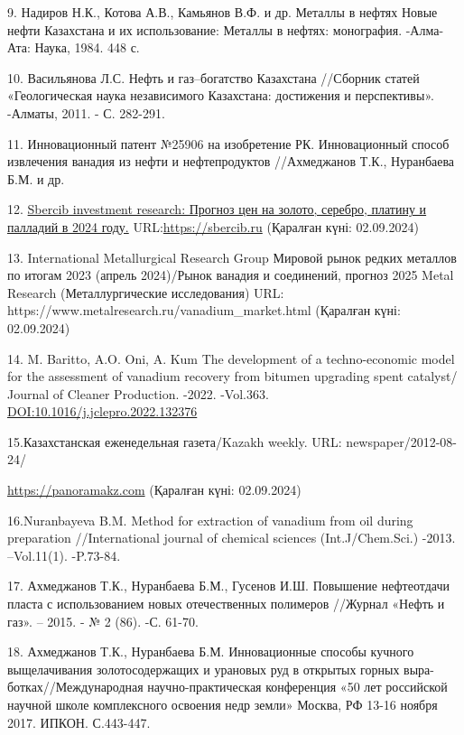 \begin{references}
9. Надиров Н.К., Котова А.В., Камьянов В.Ф. и др. Металлы в нефтях Новые
нефти Казахстана и их использование: Металлы в нефтях: монография.
-Алма-Ата: Наука, 1984. 448 с.

10. Васильянова Л.С. Нефть и газ--богатство Казахстана //Сборник статей
«Геологическая наука независимого Казахстана: достижения и перспективы».
-Алматы, 2011. - С. 282-291.

11. Инновационный патент №25906 на изобретение РК. Инновационный способ
извлечения ванадия из нефти и нефтепродуктов //Ахмеджанов Т.К.,
Нуранбаева Б.М. и др.

12.
\href{https://sbercib.ru/publications/sbercib-investment-research}{Sbercib
investment research: Прогноз цен на золото, серебро, платину и палладий
в 2024 году.} URL:\href{https://sbercib.ru/publication/prognoz-tsen-na-zoloto-serebro-platinu-i-palladii-v-2024-godu}{https://sbercib.ru}
(Қаралған күні: 02.09.2024)

13. International Metallurgical Research Group Мировой рынок редких
металлов по итогам 2023 (апрель 2024)/Рынок ванадия и соединений,
прогноз 2025 Metal Research (Металлургические исследования) URL: https://www.metalresearch.ru/vanadium\_market.html (Қаралған күні:
02.09.2024)

14. M. Baritto, A.O. Oni, A. Kum The development of a techno-economic
model for the assessment of vanadium recovery from bitumen upgrading
spent catalyst/ Journal of Cleaner Production. -2022. -Vol.363.
\href{https://doi.org/10.1016/j.jclepro.2022.132376}{DOI:10.1016/j.jclepro.2022.132376}

15.Казахстанская еженедельная газета/Kazakh weekly. URL:
newspaper/2012-08-24/ 

\href{https://panoramakz.com/index.php/economics/oil/item/32263-?utm_source=google.com&utm_medium=organic&utm_campaign=google.com&utm_referrer=google.com}{https://panoramakz.com}
(Қаралған күні: 02.09.2024)

16.Nuranbayeva B.M. Method for extraction of vanadium from oil during
preparation //International journal of chemical sciences
(Int.J/Chem.Sci.) -2013. --Vol.11(1). -P.73-84.

17. Ахмеджанов Т.К., Нуранбаева Б.М., Гусенов И.Ш. Повышение нефтеотдачи
пласта с использованием новых отечественных полимеров //Журнал «Нефть и
газ». -- 2015. - № 2 (86). -С. 61-70.

18. Ахмеджанов Т.К., Нуранбаева Б.М. Инновационные способы кучного
выщелачивания золотосодержащих и урановых руд в открытых горных
выра-ботках//Международная научно-практическая конференция «50 лет
российской научной школе комплексного освоения недр земли» Москва, РФ
13-16 ноября 2017. ИПКОН. С.443-447.


\end{references}
